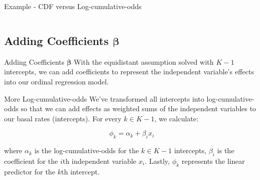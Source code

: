 \begin{frame}{Example - CDF versus Log-cumulative-odds}
	\begin{columns}
		\begin{column}{0.5\textwidth}
			\centering
		\end{column}
		\begin{column}{0.5\textwidth}
			\centering
		\end{column}
	\end{columns}
\end{frame}

\subsection{Adding Coefficients $\boldsymbol{\beta}$}
\begin{frame}{Adding Coefficients $\boldsymbol{\beta}$}
	With the equidistant assumption solved with $K-1$ intercepts,
	we can add coefficients to represent the independent variable's
	effects into our ordinal regression model.
\end{frame}

\begin{frame}{More Log-cumulative-odds}
	We've transformed all intercepts into log-cumulative-odds so that we
	can add effects as weighted sums of the independent variables to our
	basal rates (intercepts).
	\vfill
	For every $k \in K-1$, we calculate:

	$$\phi_k = \alpha_k + \beta_i x_i$$

	where $\alpha_k$ is the log-cumulative-odds for the $k \in K-1$ intercepts,
	$\beta_i$ is the coefficient for the $i$th independent variable $x_i$.
	\vfill
	Lastly, $\phi_k$ represents the linear predictor for the $k$th intercept.
\end{frame}

